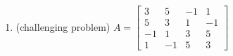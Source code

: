 \documentclass{ximera}
\begin{document}
\begin{problem}
\begin{enumerate}
\item\label{prob:findQg} (challenging problem) $A = \begin{bmatrix}
3 & 5 & -1 & 1 \\
5 & 3 & 1 & -1 \\
-1 & 1 & 3 & 5 \\
1 & -1 & 5 & 3
\end{bmatrix}$
\end{enumerate}





\end{problem}
\end{document}
